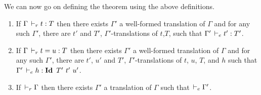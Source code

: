 \documentclass[a4paper,english]{lipics-utf8x}
\begin{document}
  We can now go on defining the theorem using the above definitions.

  \begin{theorem}[Translation]
    \leavevmode
    \begin{enumerate}
      \item If $\Gamma \,\vdash_r t : T$ then there exists $\Gamma'$ a well-formed
      translation of $\Gamma$ and for any such $\Gamma'$, there are $t'$ and
      $T'$, $\Gamma'$-translations of $t$,$T$,
      such that $\Gamma' \,\vdash_e t' : T'$.
      \item If $\Gamma \,\vdash_r t = u : T$ then there exists $\Gamma'$ a
      well-formed translation of $\Gamma$ and for any such $\Gamma'$, there are
      $t'$, $u'$ and $T'$, $\Gamma'$-translations of $t$, $u$, $T$, and $h$ such
      that $\Gamma' \dere h : \Id T'\ t'\ u'$.
      \item If $\,\vdash_r \Gamma$ then there exists $\Gamma'$ a translation of
      $\Gamma$ such that $\,\vdash_e \Gamma'$.
    \end{enumerate}
  \end{theorem}
\end{document}

